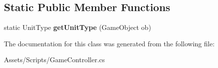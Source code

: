 \subsection*{Static Public Member Functions}
\begin{DoxyCompactItemize}
\item 
\hypertarget{class_game_controller_1_1_player_a0e2648f9c886f3ca4b7484f96694187d}{}static Unit\+Type {\bfseries get\+Unit\+Type} (Game\+Object ob)\label{class_game_controller_1_1_player_a0e2648f9c886f3ca4b7484f96694187d}

\end{DoxyCompactItemize}


The documentation for this class was generated from the following file\+:\begin{DoxyCompactItemize}
\item 
Assets/\+Scripts/Game\+Controller.\+cs\end{DoxyCompactItemize}
